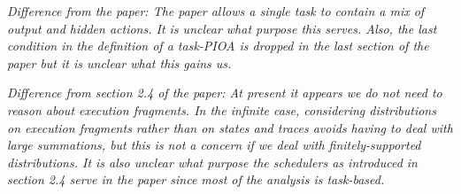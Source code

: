 \documentclass[10pt]{article}
\begin{document}
{\small \em Difference from the paper: The paper allows a single task to contain a mix of output and hidden actions. It is unclear what purpose this serves. Also, the last condition in the definition of a task-PIOA is dropped in the last section of the paper but it is unclear what this gains us.}













{\small \em Difference from section 2.4 of the paper: At present it appears we do not need to reason about execution fragments. In the infinite case, considering distributions on execution fragments rather than on states and traces avoids having to deal with large summations, but this is not a concern if we deal with finitely-supported distributions. It is also unclear what purpose the schedulers as introduced in section 2.4 serve in the paper since most of the analysis is task-based.}
\end{document}
